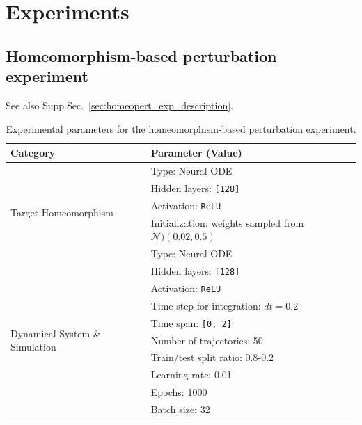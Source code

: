 \documentclass{article}
\theoremstyle{definition} \newtheorem{definition}{Definition}  \newtheorem{example}{Example}
\theoremstyle{remark} \newtheorem{remark}{Remark}
\newcounter{ct}
\begin{document}
\newpage
\section{Experiments}
\subsection{Homeomorphism-based perturbation experiment}\label{sec:homeopert_exp_details}
See also Supp.Sec.~\ref{sec:homeopert_exp_description}.

\begin{table}[h]
\centering
\caption{Experimental parameters for the homeomorphism-based perturbation experiment.}
\label{tab:perthomeo_params}
\begin{tabular}{ll}
\toprule
\textbf{Category} & \textbf{Parameter (Value)} \\
\midrule
\multirow{5}{*}{Target Homeomorphism} 
    & Type: Neural ODE \\
    & Hidden layers: \texttt{[128]} \\
    & Activation: \texttt{ReLU} \\
    & Initialization: weights sampled from $\mathcal{N})(0.02,0.5)$ \\
\midrule
\multirow{3}{*}{Learned Homeomorphism} 
    & Type: Neural ODE \\
    & Hidden layers: \texttt{[128]} \\
    & Activation: \texttt{ReLU} \\
\midrule
\multirow{5}{*}{Dynamical System \& Simulation} %
    & Time step for integration: $dt=0.2$ \\
    & Time span: \texttt{[0, 2]} \\
    & Number of trajectories: 50 \\
    & Train/test split ratio: 0.8-0.2 \\
\midrule
\multirow{3}{*}{Training} 
    & Learning rate:  0.01 \\
    & Epochs: 1000 \\
    & Batch size: 32 \\
\bottomrule
\end{tabular}
\end{table}
\end{document}
